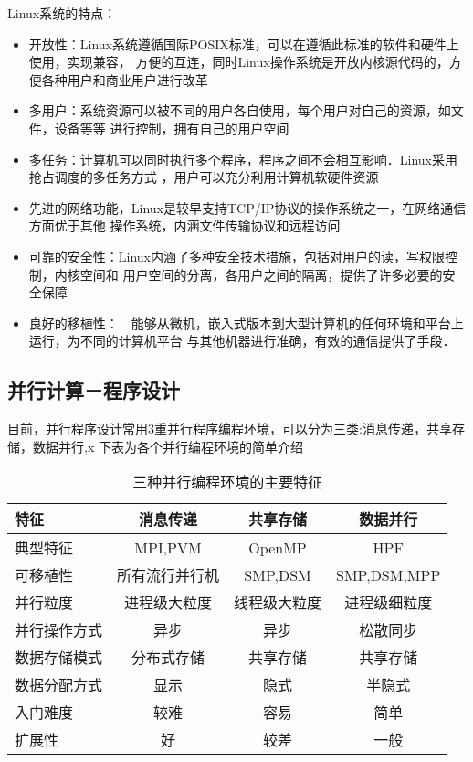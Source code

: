     Linux系统的特点：
    \begin{itemize}
    \item 开放性：Linux系统遵循国际POSIX标准，可以在遵循此标准的软件和硬件上使用，实现兼容，
方便的互连，同时Linux操作系统是开放内核源代码的，方便各种用户和商业用户进行改革
    \item 多用户：系统资源可以被不同的用户各自使用，每个用户对自己的资源，如文件，设备等等
进行控制，拥有自己的用户空间
    \item 多任务：计算机可以同时执行多个程序，程序之间不会相互影响．Linux采用抢占调度的多任务方式
，用户可以充分利用计算机软硬件资源
    \item 先进的网络功能，Linux是较早支持TCP/IP协议的操作系统之一，在网络通信方面优于其他
操作系统，内涵文件传输协议和远程访问
    \item 可靠的安全性：Linux内涵了多种安全技术措施，包括对用户的读，写权限控制，内核空间和
用户空间的分离，各用户之间的隔离，提供了许多必要的安全保障
    \item 良好的移植性：　能够从微机，嵌入式版本到大型计算机的任何环境和平台上运行，为不同的计算机平台
与其他机器进行准确，有效的通信提供了手段．
    \end{itemize}
\subsection{并行计算－程序设计}
    目前，并行程序设计常用3重并行程序编程环境，可以分为三类:消息传递，共享存储，数据并行,x
下表为各个并行编程环境的简单介绍

    \begin{table}[htbp]
    \centering  %
    \begin{tabular}{lccc}  %
    \hline
    特征&消息传递&共享存储&数据并行\\ \hline 
    典型特征&MPI,PVM&OpenMP&HPF\\        
    可移植性&所有流行并行机&SMP,DSM&SMP,DSM,MPP\\      
    并行粒度&进程级大粒度&线程级大粒度&进程级细粒度\\     
    并行操作方式&异步&异步&松散同步\\   
    数据存储模式&分布式存储&共享存储&共享存储\\
    数据分配方式&显示&隐式&半隐式\\
    入门难度&较难&容易&简单　\\
    扩展性&好&较差&一般\\ \hline
    \end{tabular}
    \caption{三种并行编程环境的主要特征}
    \end{table}

